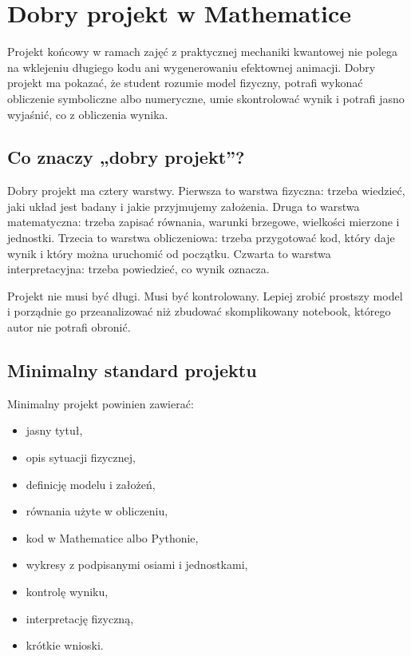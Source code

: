 \chapter{Dobry projekt w Mathematice}

\begin{summarybox}
Projekt końcowy w ramach zajęć z praktycznej mechaniki kwantowej nie polega na
wklejeniu długiego kodu ani wygenerowaniu efektownej animacji. Dobry projekt ma
pokazać, że student rozumie model fizyczny, potrafi wykonać obliczenie
symboliczne albo numeryczne, umie skontrolować wynik i potrafi jasno wyjaśnić,
co z obliczenia wynika.
\end{summarybox}

\section{Co znaczy „dobry projekt”?}

Dobry projekt ma cztery warstwy. Pierwsza to warstwa fizyczna: trzeba wiedzieć,
jaki układ jest badany i jakie przyjmujemy założenia. Druga to warstwa
matematyczna: trzeba zapisać równania, warunki brzegowe, wielkości mierzone i
jednostki. Trzecia to warstwa obliczeniowa: trzeba przygotować kod, który daje
wynik i który można uruchomić od początku. Czwarta to warstwa interpretacyjna:
trzeba powiedzieć, co wynik oznacza.

Projekt nie musi być długi. Musi być kontrolowany. Lepiej zrobić prostszy model i
porządnie go przeanalizować niż zbudować skomplikowany notebook, którego autor
nie potrafi obronić.

\section{Minimalny standard projektu}

Minimalny projekt powinien zawierać:
\begin{itemize}
    \item jasny tytuł,
    \item opis sytuacji fizycznej,
    \item definicję modelu i założeń,
    \item równania użyte w obliczeniu,
    \item kod w Mathematice albo Pythonie,
    \item wykresy z podpisanymi osiami i jednostkami,
    \item kontrolę wyniku,
    \item interpretację fizyczną,
    \item krótkie wnioski.
\end{itemize}

